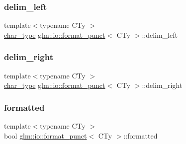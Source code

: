 \subsubsection{\texorpdfstring{delim\+\_\+left}{delim\_left}}
{\footnotesize\ttfamily template$<$typename C\+Ty $>$ \\
\hyperlink{classglm_1_1io_1_1format__punct_ae94c42484a4c5258ad7b2f0f029efdf3}{char\+\_\+type} \hyperlink{classglm_1_1io_1_1format__punct}{glm\+::io\+::format\+\_\+punct}$<$ C\+Ty $>$\+::delim\+\_\+left}

\mbox{\label{classglm_1_1io_1_1format__punct_a62fb1280404360463ec5af7144aa0949}} 
\subsubsection{\texorpdfstring{delim\+\_\+right}{delim\_right}}
{\footnotesize\ttfamily template$<$typename C\+Ty $>$ \\
\hyperlink{classglm_1_1io_1_1format__punct_ae94c42484a4c5258ad7b2f0f029efdf3}{char\+\_\+type} \hyperlink{classglm_1_1io_1_1format__punct}{glm\+::io\+::format\+\_\+punct}$<$ C\+Ty $>$\+::delim\+\_\+right}

\mbox{\label{classglm_1_1io_1_1format__punct_ab28088e6eef03fe4222fa8a5dd95288e}} 
\subsubsection{\texorpdfstring{formatted}{formatted}}
{\footnotesize\ttfamily template$<$typename C\+Ty $>$ \\
bool \hyperlink{classglm_1_1io_1_1format__punct}{glm\+::io\+::format\+\_\+punct}$<$ C\+Ty $>$\+::formatted}

\mbox{\label{classglm_1_1io_1_1format__punct_a763f60aeaecec9290917ed1d83b79838}} 
